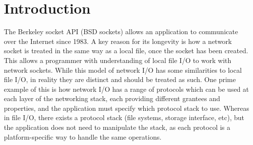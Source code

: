 \documentclass{l4proj}
\begin{document}
%
%
%
%
%
%
%
%
\chapter{Introduction}


The Berkeley socket API (BSD sockets) allows an application to communicate over the Internet since 1983.
A key reason for its longevity is how a network socket is treated in the same way as a local file, once the socket has been created.
This allows a programmer with understanding of local file I/O to work with network sockets.
While this model of network I/O has some similarities to local file I/O, in reality they are distinct and should be treated as such.
One prime example of this is how network I/O has a range of protocols which can be used at each layer of the networking stack,
each providing different grantees and properties, and the application must specify which protocol stack to use.
Whereas in file I/O, there exists a protocol stack (file systems, storage interface, etc), but the application does not need to
manipulate the stack, as each protocol is a platform-specific way to handle the same operations.
\end{document}
